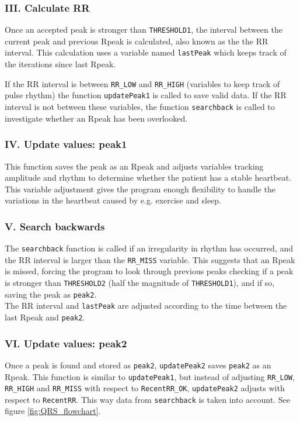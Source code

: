\subsubsection*{III. Calculate RR}
Once an accepted peak is stronger than \texttt{THRESHOLD1}, the interval between the current peak and previous Rpeak is calculated, also known as the the RR interval. This calculation uses a variable named \texttt{lastPeak} which keeps track of the iterations since last Rpeak. 

If the RR interval is between \texttt{RR\_LOW} and \texttt{RR\_HIGH} (variables to keep track of pulse rhythm) the function \texttt{updatePeak1} is called to save valid data. If the RR interval is not between these variables, the function \texttt{searchback} is called to investigate whether an Rpeak has been overlooked.

\subsubsection*{IV. Update values: peak1}
This function saves the peak as an Rpeak and adjusts variables tracking amplitude and rhythm to determine whether the patient has a stable heartbeat. This variable adjustment gives the program enough flexibility to handle the variations in the heartbeat caused by e.g. exercise and sleep.

\subsubsection*{V. Search backwards}
The \texttt{searchback} function is called if an irregularity in rhythm has occurred, and the RR interval is larger than the \texttt{RR\_MISS} variable. This suggests that an Rpeak is missed, forcing the program to look through previous peaks checking if a peak is stronger than \texttt{THRESHOLD2} (half the magnitude of \texttt{THRESHOLD1}), and if so, saving the peak as \texttt{peak2}.\\

The RR interval and \texttt{lastPeak} are adjusted according to the time between the last Rpeak and \texttt{peak2}.

\subsubsection*{VI. Update values: peak2}
Once a peak is found and stored as \texttt{peak2}, \texttt{updatePeak2} saves \texttt{peak2} as an Rpeak. This function is similar to \texttt{updatePeak1}, but instead of adjusting \texttt{RR\_LOW}, \texttt{RR\_HIGH} and \texttt{RR\_MISS} with respect to \texttt{RecentRR\_OK}, \texttt{updatePeak2} adjusts with respect to \texttt{RecentRR}. This way data from \texttt{searchback} is taken into account. See figure \ref{fig:QRS_flowchart}.
